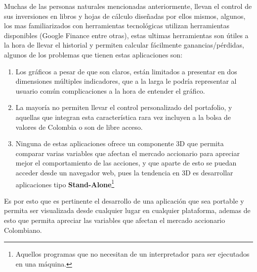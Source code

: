 Muchas de las personas naturales mencionadas anteriormente, llevan el control de sus inversiones en libros y hojas de cálculo diseñadas por ellos mismos, algunos, los mas familiarizados con herramientas tecnológicas utilizan herramientas disponibles (Google Finance entre otras), estas ultimas herramientas son útiles a la hora de llevar el historial y permiten calcular fácilmente ganancias/pérdidas, algunos de los problemas que tienen estas aplicaciones son: 
\begin{enumerate}
\item Los gráficos a pesar de que son claros, están limitados a presentar en dos dimensiones múltiples indicadores, que a la larga le podría representar al usuario común complicaciones a la hora de entender el gráfico.
\item La mayoría no permiten llevar el control personalizado del portafolio, y aquellas que integran esta característica rara vez incluyen a la bolsa de valores de Colombia o son de libre acceso.
\item Ninguna de estas aplicaciones ofrece un componente 3D que permita comparar varias variables que afectan el mercado accionario para apreciar mejor el comportamiento de las acciones, y que aparte de esto se puedan acceder desde un navegador web, pues la tendencia en 3D es desarrollar aplicaciones tipo \textbf{Stand-Alone}\footnote{Aquellos programas que no necesitan de un interpretador para ser ejecutados en una máquina.}
\end{enumerate}

Es por esto que es pertinente el desarrollo de una aplicación que sea portable y permita ser visualizada desde cualquier lugar en cualquier plataforma, ademas de esto que permita apreciar las variables que afectan el mercado accionario Colombiano.